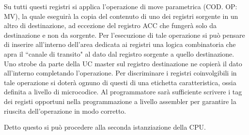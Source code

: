 Su tutti questi registri si applica l'operazione di move parametrica (COD. OP: MV), la quale eseguirà la copia del contenuto di uno dei registri sorgente in un altro di destinazione, ad eccezione del registro ACC che fungerà solo da destinazione e non da sorgente. Per l'esecuzione di tale operazione si può pensare di inserire all'interno dell'area dedicata ai registri una logica combinatoria che apra il \textquotedblleft canale di transito" al dato dal registro sorgente a quello destinazione. Uno strobe da parte della UC master sul registro destinazione ne copierà il dato all'interno completando l'operazione. Per discriminare i registri coinvolgibili in tale operazione si doterà ognuno di questi di una etichetta caratteristica, ossia definita a livello di microcodice. Al programmatore sarà sufficiente scrivere i tag dei registi opportuni nella programmazione a livello assembler per garantire la riuscita dell'operazione in modo corretto.
\par \bigskip \noindent
Detto questo si può procedere alla seconda istanziazione della CPU.